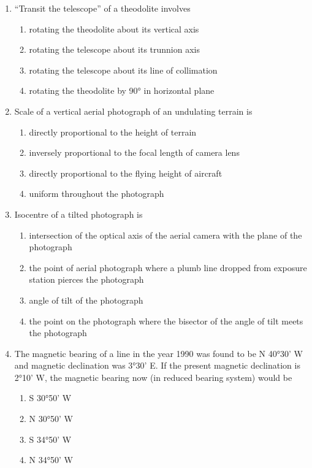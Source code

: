 \documentclass[12pt]{article}
\begin{document}
\begin{enumerate}
\item ``Transit the telescope'' of a theodolite involves

\begin{enumerate}
     \item rotating the theodolite about its vertical axis 
   \item rotating the telescope about its trunnion axis 
   \item rotating the telescope about its line of collimation 
   \item rotating the theodolite by 90° in horizontal plane
\end{enumerate}

\item Scale of a vertical aerial photograph of an undulating terrain is

\begin{enumerate}
    \item directly proportional to the height of terrain 
   \item inversely proportional to the focal length of camera lens 
   \item directly proportional to the flying height of aircraft 
   \item uniform throughout the photograph
\end{enumerate}

\item  Isocentre of a tilted photograph is
\begin{enumerate}
    \item intersection of the optical axis of the aerial camera with the plane of the photograph 
   \item the point of aerial photograph where a plumb line dropped from exposure station pierces the photograph 
   \item angle of tilt of the photograph 
   \item the point on the photograph where the bisector of the angle of tilt meets the
photograph 
\end{enumerate}

\item The magnetic bearing of a line in the year 1990 was found to be N 40°30' W and
magnetic declination was 3°30' E. If the present magnetic declination is 2°10' W,
the magnetic bearing now (in reduced bearing system) would be 

\begin{enumerate}
 \item S 30°50' W 
   \item N 30°50' W 
   \item S 34°50' W 
   \item N 34°50' W
\end{enumerate}


\end{enumerate}
\end{document}
